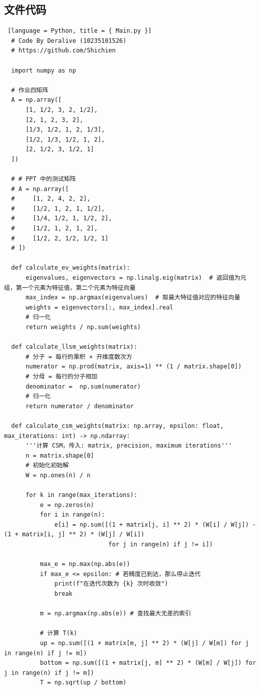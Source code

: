 \subsection{文件代码}

\begin{lstlisting} [language = Python, title = { Main.py }]
  # Code By Deralive (10235101526)
  # https://github.com/Shichien
  
  import numpy as np
  
  # 作业四矩阵
  A = np.array([
      [1, 1/2, 3, 2, 1/2],
      [2, 1, 2, 3, 2],
      [1/3, 1/2, 1, 2, 1/3],
      [1/2, 1/3, 1/2, 1, 2],
      [2, 1/2, 3, 1/2, 1]
  ])
  
  # # PPT 中的测试矩阵
  # A = np.array([
  #     [1, 2, 4, 2, 2],
  #     [1/2, 1, 2, 1, 1/2],
  #     [1/4, 1/2, 1, 1/2, 2],
  #     [1/2, 1, 2, 1, 2],
  #     [1/2, 2, 1/2, 1/2, 1]
  # ])
  
  def calculate_ev_weights(matrix):
      eigenvalues, eigenvectors = np.linalg.eig(matrix)  # 返回值为元组，第一个元素为特征值，第二个元素为特征向量
      max_index = np.argmax(eigenvalues)  # 取最大特征值对应的特征向量
      weights = eigenvectors[:, max_index].real
      # 归一化
      return weights / np.sum(weights)
  
  def calculate_llsm_weights(matrix):
      # 分子 = 每行的乘积 × 开维度数次方
      numerator = np.prod(matrix, axis=1) ** (1 / matrix.shape[0])
      # 分母 = 每行的分子相加
      denominator =  np.sum(numerator)
      # 归一化
      return numerator / denominator
  
  def calculate_csm_weights(matrix: np.array, epsilon: float, max_iterations: int) -> np.ndarray:
      '''计算 CSM，传入: matrix, precision, maximum iterations'''
      n = matrix.shape[0]
      # 初始化初始解
      W = np.ones(n) / n
  
      for k in range(max_iterations):
          e = np.zeros(n)
          for i in range(n):
              e[i] = np.sum([(1 + matrix[j, i] ** 2) * (W[i] / W[j]) - (1 + matrix[i, j] ** 2) * (W[j] / W[i])
                             for j in range(n) if j != i])
  
          max_e = np.max(np.abs(e))
          if max_e <= epsilon: # 若精度已到达，那么停止迭代
              print(f"在迭代次数为 {k} 次时收敛")
              break
  
          m = np.argmax(np.abs(e)) # 查找最大无差的索引
  
          # 计算 T(k)
          up = np.sum([(1 + matrix[m, j] ** 2) * (W[j] / W[m]) for j in range(n) if j != m])
          bottom = np.sum([(1 + matrix[j, m] ** 2) * (W[m] / W[j]) for j in range(n) if j != m])
          T = np.sqrt(up / bottom)
  

\end{lstlisting}
